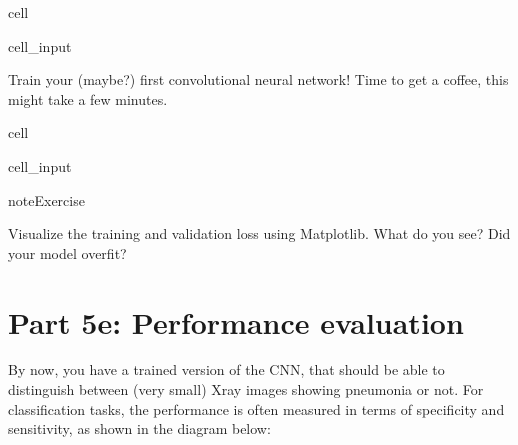 \documentclass[letterpaper,10pt,english]{jupyterBook}
\begin{document}
\begin{sphinxuseclass}{cell}
\begin{sphinxVerbatimInput}
\begin{sphinxuseclass}{cell_input}
\begin{sphinxVerbatim}[commandchars=\\\{\}]
       
\end{sphinxVerbatim}

\end{sphinxuseclass}\end{sphinxVerbatimInput}

\end{sphinxuseclass}
\sphinxAtStartPar
Train your (maybe?) first convolutional neural network! Time to get a coffee, this might take a few minutes. 

\begin{sphinxuseclass}{cell}\begin{sphinxVerbatimInput}

\begin{sphinxuseclass}{cell_input}
\begin{sphinxVerbatim}[commandchars=\\\{\}]
  
  
         
\end{sphinxVerbatim}

\end{sphinxuseclass}\end{sphinxVerbatimInput}

\end{sphinxuseclass}
\begin{sphinxadmonition}{note}{Exercise}

\sphinxAtStartPar
Visualize the training and validation loss using Matplotlib. What do you see? Did your model overfit?
\end{sphinxadmonition}


\section{Part 5e: Performance evaluation}
\label{\detokenize{notebooks/Tutorial2_ConvolutionalNeuralNetworks/Tutorial2_ConvolutionalNeuralNetworks_student:part-5e-performance-evaluation}}
\sphinxAtStartPar
By now, you have a trained version of the CNN, that should be able to distinguish between (very small) X\sphinxhyphen{}ray images showing pneumonia or not. For classification tasks, the performance is often measured in terms of specificity and sensitivity, as shown in the diagram below:
\end{document}
